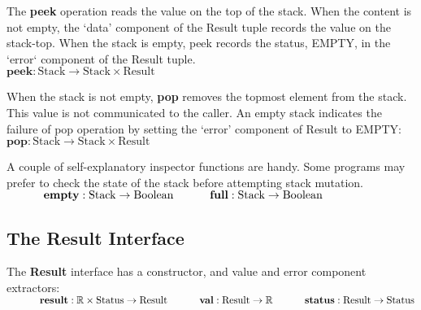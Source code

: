 \documentclass[10pt]{article}
\begin{document}
  The \textbf{peek} operation reads the value on the top of the stack. When the content is not empty, the `data' component of the Result tuple records the value on the stack-top. When the stack is empty, peek records the status, EMPTY, in the `error` component of the Result tuple.
  \vspace*{6pt}\\\hspace*{32pt}\(
  \textbf{peek}: \mathrm{Stack} \rightarrow \mathrm{Stack \times Result}
  \)\vspace*{6pt}

  When the stack is not empty, {\textbf{pop}} removes the topmost element from the stack. This value is not communicated to the caller. An empty stack indicates the failure of pop operation by setting the `error' component of Result to EMPTY:
  \vspace*{6pt}\\\hspace*{32pt}\(
  \textbf{pop}: \mathrm{Stack} \rightarrow \mathrm{Stack \times Result}
  \)\vspace*{6pt}

  A couple of self-explanatory inspector functions are handy. Some programs may prefer to check the state of the stack before attempting stack mutation.
  \vspace*{6pt}\\\(
  \hspace*{32pt}\textbf{empty}: \mathrm{Stack} \rightarrow \mathrm{Boolean}\vspace*{4pt}\\
  \hspace*{32pt}\textbf{full}: \mathrm{Stack} \rightarrow \mathrm{Boolean}
  \)\vspace*{6pt}

\subsection{The Result Interface}
  The \textbf{Result} interface has a constructor, and value and error component extractors:
  \vspace*{6pt}\\\(
  \hspace*{32pt}\textbf{result}: \mathbb{R} \times \mathrm{Status} \rightarrow \mathrm{Result}\vspace*{4pt}\\
  \hspace*{32pt}\textbf{val}: \mathrm{Result} \rightarrow \mathbb{R}\vspace*{4pt}\\
  \hspace*{32pt}\textbf{status}: \mathrm{Result} \rightarrow \mathrm{Status}
  \)\vspace*{6pt}  
  
\end{document}
